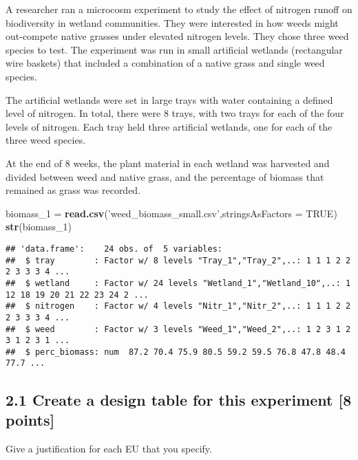 \documentclass[
]{article}
\newenvironment{Shaded}{\begin{snugshade}}{\end{snugshade}}
\newcommand{\DataTypeTok}[1]{\textcolor[rgb]{0.13,0.29,0.53}{#1}}
\newcommand{\DecValTok}[1]{\textcolor[rgb]{0.00,0.00,0.81}{#1}}
\newcommand{\KeywordTok}[1]{\textcolor[rgb]{0.13,0.29,0.53}{\textbf{#1}}}
\newcommand{\NormalTok}[1]{#1}
\newcommand{\OtherTok}[1]{\textcolor[rgb]{0.56,0.35,0.01}{#1}}
\newcommand{\StringTok}[1]{\textcolor[rgb]{0.31,0.60,0.02}{#1}}
\begin{document}
A researcher ran a microcosm experiment to study the effect of nitrogen
runoff on biodiversity in wetland communities. They were interested in
how weeds might out-compete native grasses under elevated nitrogen
levels. They chose three weed species to test. The experiment was run in
small artificial wetlands (rectangular wire baskets) that included a
combination of a native grass and single weed species.

The artificial wetlands were set in large trays with water containing a
defined level of nitrogen. In total, there were 8 trays, with two trays
for each of the four levels of nitrogen. Each tray held three artificial
wetlands, one for each of the three weed species.

At the end of 8 weeks, the plant material in each wetland was harvested
and divided between weed and native grass, and the percentage of biomass
that remained as grass was recorded.

\begin{Shaded}
\begin{Highlighting}[]
\NormalTok{biomass_}\DecValTok{1}\NormalTok{ =}\StringTok{ }\KeywordTok{read.csv}\NormalTok{(}\StringTok{'weed_biomass_small.csv'}\NormalTok{,}\DataTypeTok{stringsAsFactors =} \OtherTok{TRUE}\NormalTok{)}
\KeywordTok{str}\NormalTok{(biomass_}\DecValTok{1}\NormalTok{)}
\end{Highlighting}
\end{Shaded}

\begin{verbatim}
## 'data.frame':    24 obs. of  5 variables:
##  $ tray        : Factor w/ 8 levels "Tray_1","Tray_2",..: 1 1 1 2 2 2 3 3 3 4 ...
##  $ wetland     : Factor w/ 24 levels "Wetland_1","Wetland_10",..: 1 12 18 19 20 21 22 23 24 2 ...
##  $ nitrogen    : Factor w/ 4 levels "Nitr_1","Nitr_2",..: 1 1 1 2 2 2 3 3 3 4 ...
##  $ weed        : Factor w/ 3 levels "Weed_1","Weed_2",..: 1 2 3 1 2 3 1 2 3 1 ...
##  $ perc_biomass: num  87.2 70.4 75.9 80.5 59.2 59.5 76.8 47.8 48.4 77.7 ...
\end{verbatim}

\hypertarget{create-a-design-table-for-this-experiment-8-points}{%
\subsection{2.1 Create a design table for this experiment {[}8
points{]}}\label{create-a-design-table-for-this-experiment-8-points}}

Give a justification for each EU that you specify.
\end{document}

